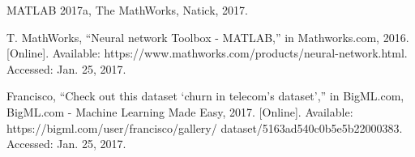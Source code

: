 \begin{thebibliography}{99}
MATLAB 2017a, The MathWorks, Natick, 2017.

T. MathWorks, “Neural network Toolbox - MATLAB,” in Mathworks.com, 2016. [Online]. Available: https://www.mathworks.com/products/neural-network.html. Accessed: Jan. 25, 2017.

Francisco, “Check out this dataset ‘churn in telecom’s dataset’,”
in BigML.com, BigML.com - Machine Learning Made Easy,
2017. [Online]. Available: https://bigml.com/user/francisco/gallery/
dataset/5163ad540c0b5e5b22000383. Accessed: Jan. 25, 2017.
\end{thebibliography}

